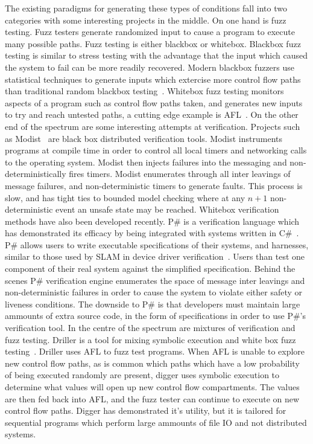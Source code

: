 The existing paradigms for generating these types of conditions fall into two
categories with some interesting projects in the middle. On one hand is fuzz
testing. Fuzz testers generate randomized input to cause a program to execute
many possible paths.  Fuzz testing is either blackbox or whitebox.  Blackbox
fuzz testing is similar to stress testing with the advantage that the input
which caused the system to fail can be more readily recovered. Modern blackbox
fuzzers use statistical techniques to generate inputs which extercise more
control flow paths than traditional random blackbox
testing~\cite{HouseholderProbabilityBasedParameter2012}. Whitebox fuzz testing
monitors aspects of a program such as control flow paths taken, and generates
new inputs to try and reach untested paths, a cutting edge example is
AFL~\cite{afl}. On the other end of the spectrum are some interesting attempts
at verification. Projects such as Modist~\cite{Yang:2009:MTM:1558977.1558992}
are black box distributed verification tools.  Modist instruments programs at
compile time in order to control all local timers and networking calls to the
operating system.  Modist then injects failures into the messaging and
non-deterministically fires timers. Modist enumerates through all inter
leavings of message failures, and non-deterministic timers to generate faults.
This process is slow, and has tight ties to bounded model checking where at any
$n+1$ non-deterministic event an unsafe state may be reached.  Whitebox
verification methods have also been developed recently. P\# is a verification
language which has demonstrated its efficacy by being integrated with systems
written in C\#~\cite{194442}. P\# allows users to write executable
specifications of their systems, and harnesses, similar to those used by SLAM
in device driver verification~\cite{Ball:2011:DSM:1965724.1965743}. Users than
test one component of their real system against the simplified specification.
Behind the scenes P\# verification engine enumerates the space of message inter
leavings and non-deterministic failures in order to cause the system to violate
either safety or liveness conditions. The downside to P\# is that developers
must maintain large ammounts of extra source code, in the form of
specifications in order to use P\#'s verification tool. In the centre of the
spectrum are mixtures of verification and fuzz testing.  Driller is a tool for
mixing symbolic execution and white box fuzz
testing~\cite{Stephens2016DrillerAF}.  Driller uses AFL to fuzz test programs.
When AFL is unable to explore new control flow paths, as is common which paths
which have a low probability of being executed randomly are present, digger
uses symbolic execution to determine what values will open up new control flow
compartments. The values are then fed back into AFL, and the fuzz tester can
continue to execute on new control flow paths. Digger has demonstrated it's
utility, but it is tailored for sequential programs which perform large
ammounts of file IO and not distributed systems.

